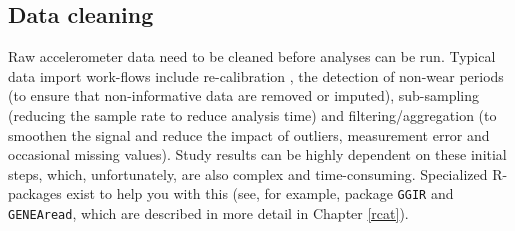 \documentclass[]{book}
\newenvironment{Shaded}{\begin{snugshade}}{\end{snugshade}}
\newcommand{\KeywordTok}[1]{\textcolor[rgb]{0.13,0.29,0.53}{\textbf{#1}}}
\newcommand{\DataTypeTok}[1]{\textcolor[rgb]{0.13,0.29,0.53}{#1}}
\newcommand{\DecValTok}[1]{\textcolor[rgb]{0.00,0.00,0.81}{#1}}
\newcommand{\StringTok}[1]{\textcolor[rgb]{0.31,0.60,0.02}{#1}}
\newcommand{\CommentTok}[1]{\textcolor[rgb]{0.56,0.35,0.01}{\textit{#1}}}
\newcommand{\OperatorTok}[1]{\textcolor[rgb]{0.81,0.36,0.00}{\textbf{#1}}}
\newcommand{\NormalTok}[1]{#1}
\begin{document}
\begin{Shaded}
\end{Shaded}

\subsection{Data cleaning}\label{data-cleaning}

  

Raw accelerometer data need to be cleaned before analyses can be run.
Typical data import work-flows include re-calibration \citep[to reduce
systematic measurement error;][]{VanHees2014}, the detection of non-wear
periods (to ensure that non-informative data are removed or imputed),
sub-sampling (reducing the sample rate to reduce analysis time) and
filtering/aggregation (to smoothen the signal and reduce the impact of
outliers, measurement error and occasional missing values). Study
results can be highly dependent on these initial steps, which,
unfortunately, are also complex and time-consuming. Specialized
R-packages exist to help you with this (see, for example, package
\texttt{GGIR} and \texttt{GENEAread}, which are described in more detail
in Chapter \ref{rcat}).
\end{document}
